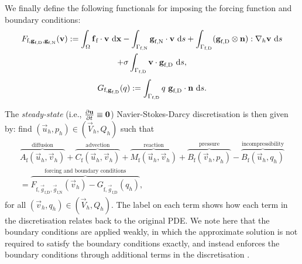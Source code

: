             We finally define the following functionals for imposing the forcing function and boundary conditions:
            \begin{multline}
                    F_{\text{f},\boldsymbol{\mathbf{g}}_\text{f,D}, \boldsymbol{\mathbf{g}}_\text{f,N}}(\boldsymbol{\mathbf{v}}) := \int_{\Omega} \boldsymbol{\mathbf{f}}_\text{f} \cdot \boldsymbol{\mathbf{v}} ~\mathrm{d}\boldsymbol{\mathbf{x}} - \int_{\Gamma_\text{f,N}} \boldsymbol{\mathbf{g}}_\text{f,N}  \cdot\boldsymbol{\mathbf{v}} ~\mathrm{d} s + \int_{\Gamma_\text{f,D}} (\boldsymbol{\mathbf{g}}_\text{f,D} \otimes \boldsymbol{\mathbf{n}}) : \nabla_h \boldsymbol{\mathbf{v}} ~\mathrm{d} s \\ + \sigma\int_{\Gamma_\text{f,D}} \boldsymbol{\mathbf{v}} \cdot \boldsymbol{\mathbf{g}}_\text{f,D} ~\mathrm{d} s,
            \end{multline}
            \begin{equation}
                    G_{\text{f},\boldsymbol{\mathbf{g}}_\text{f,D}}(q) := \int_{\Gamma_\text{f,D}} q ~ \boldsymbol{\mathbf{g}}_\text{f,D} \cdot \boldsymbol{\mathbf{n}} ~\mathrm{d} s.
            \end{equation}

            The \textit{steady-state} (i.e., $\pdv{\boldsymbol{\mathbf{u}}}{t} \equiv \boldsymbol{\mathbf{0}}$) Navier-Stokes-Darcy discretisation is then given by: find $(\vec{u}_h, p_h) \in (\vec{V}_h, Q_h)$ such that
            \begin{multline}
                \overbrace{A_\text{f}(\vec{u}_h, \vec{v}_h)}^{\text{diffusion}} + \overbrace{C_\text{f}(\vec{u}_h, \vec{v}_h)}^{\text{advection}} + \overbrace{M_\text{f}(\vec{u}_h, \vec{v}_h)}^{\text{reaction}} + \overbrace{B_\text{f}(\vec{v}_h, p_h)}^{\text{pressure}} - \overbrace{B_\text{f}(\vec{u}_h, q_h)}^{\text{incompressibility}} \\ = \overbrace{F_{\text{f},\vec{g}_\text{f,D},\vec{g}_\text{f,N}}(\vec{v}_h) - G_{\text{f},\vec{g}_\text{f,D}}(q_h)}^{\text{forcing and boundary conditions}},
                \label{eq:nsb-discretisation}
            \end{multline}
            for all $(\vec{v}_h, q_h) \in (\vec{V}_h, Q_h)$. The label on each term shows how each term in the discretisation relates back to the original PDE. We note here that the boundary conditions are applied weakly, in which the approximate solution is not required to satisfy the boundary conditions exactly, and instead enforces the boundary conditions through additional terms in the discretisation \cite{bazilevsWeakImpositionDirichlet2007}.

